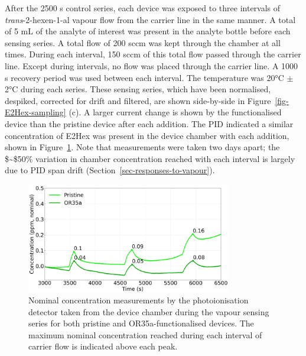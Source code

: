 \documentclass[
  a4paper,
]{scrbook}
\begin{document}
After the 2500 s control series, each device was exposed to three
intervals of \emph{trans}-2-hexen-1-al vapour flow from the carrier line
in the same manner. A total of 5 mL of the analyte of interest was
present in the analyte bottle before each sensing series. A total flow
of 200 sccm was kept through the chamber at all times. During each
interval, 150 sccm of this total flow passed through the carrier line.
Except during intervals, no flow was placed through the carrier line. A
1000 s recovery period was used between each interval. The temperature
was 20°C \(\pm\) 2°C during each series. These sensing series, which
have been normalised, despiked, corrected for drift and filtered, are
shown side-by-side in Figure~\ref{fig-E2Hex-sampling} (c). A larger
current change is shown by the functionalised device than the pristine
device after each addition. The PID indicated a similar concentration of
E2Hex was present in the device chamber with each addition, shown in
Figure~\ref{fig-E2Hex-additions-PID}. Note that measurements were taken
two days apart; the \$\sim\$50\% variation in chamber concentration
reached with each interval is largely due to PID span drift
(Section~\ref{sec-responses-to-vapour}).

\begin{figure}

{\centering \includegraphics[width=0.8\textwidth,height=\textheight]{figures/ch8/input_time_comparison.png}

}

\caption{\label{fig-E2Hex-additions-PID}Nominal concentration
measurements by the photoionisation detector taken from the device
chamber during the vapour sensing series for both pristine and
OR35a-functionalised devices. The maximum nominal concentration reached
during each interval of carrier flow is indicated above each peak.}

\end{figure}
\end{document}
